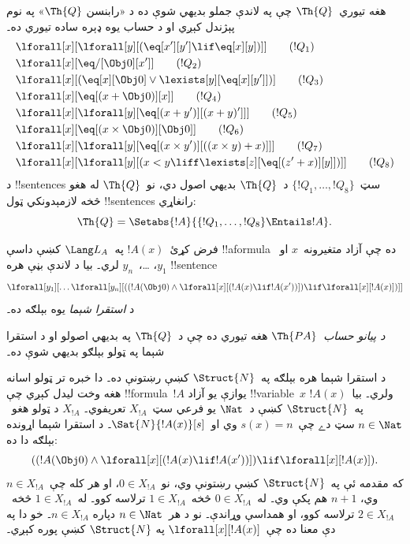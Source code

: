 \documentclass[../../../include/open-logic-section]{subfiles}
\begin{document}
\begin{defn}
هغه تيوري~$\Th{Q}$ چې په لاندې جملو بديهي شوې ده د «رابنسن
$\Th{Q}$» په نوم پېژندل کېږي او د حساب يوه ډېره ساده تيوري ده۔
\begin{align*}
& \lforall[x][\lforall[y][(\eq[x'][y'] \lif \eq[x][y])]] \tag{$!Q_1$}\\
& \lforall[x][\eq/[\Obj 0][x']] \tag{$!Q_2$}\\
& \lforall[x][(\eq[x][\Obj 0] \lor \lexists[y][\eq[x][y']])] \tag{$!Q_3$}\\
& \lforall[x][\eq[(x + \Obj 0)][x]] \tag{$!Q_4$}\\
& \lforall[x][\lforall[y][\eq[(x + y')][(x + y)']]] \tag{$!Q_5$}\\
& \lforall[x][\eq[(x \times \Obj 0)][\Obj 0]] \tag{$!Q_6$}\\
& \lforall[x][\lforall[y][\eq[(x \times y')][((x \times y) + x)]]] \tag{$!Q_7$}\\
& \lforall[x][\lforall[y][(x < y \liff \lexists[z][\eq[(z' + x)][y]])]] \tag{$!Q_8$}
\end{align*}
د !!{sentence}s سټ~$\{!Q_1, \dots, !Q_8\}$ د~$\Th{Q}$ بديهي اصول
دي، نو~$\Th{Q}$ له هغو څخه لازمېدونکي ټول !!{sentence}s رانغاړي:
\[
\Th{Q} = \Setabs{!A}{\{!Q_1, \dots, !Q_8\} \Entails !A}.
\]
\end{defn}

\begin{defn}
فرض کړئ~$!A(x)$ په~$\Lang L_A$ کښې داسې !!a{formula} ده چې آزاد
متغيرونه~$x$ او~$y_1$، \dots،~$y_n$ لري۔ بيا د لاندې بڼې هره
!!{sentence}
\[
\lforall[y_1][\dots\lforall[y_n][((!A(\Obj 0) \land \lforall[x][(!A(x)
\lif !A(x'))]) \lif \lforall[x][!A(x)])]]
\]
د \emph{استقرا شېما} يوه بېلګه ده۔

\emph{د پيانو حساب}~$\Th{PA}$ هغه تيوري ده چې د~$\Th{Q}$ په بديهي
اصولو او د استقرا شېما په ټولو بېلګو بديهي شوې ده۔
\end{defn}

\begin{explain}
د استقرا شېما هره بېلګه په~$\Struct{N}$ کښې رښتونې ده۔ دا خبره تر
ټولو اسانه هغه وخت ليدل کېږي چې !!{formula}~$!A$ يوازې يو آزاد
!!{variable}~$x$ ولري۔ بيا~$!A(x)$ په~$\Struct{N}$ کښې د~$\Nat$ يو
فرعي سټ~$X_{!A}$ تعريفوي۔ $X_{!A}$ د ټولو هغو~$n \in \Nat$ سټ دے
چې~$s(x) = n$ وي او~$\Sat{N}{!A(x)}[s]$۔ د استقرا شېما اړونده بېلګه
دا ده:
\[
((!A(\Obj 0) \land \lforall[x][(!A(x) \lif !A(x'))]) \lif
  \lforall[x][!A(x)]).
\]
که مقدمه ئې په~$\Struct{N}$ کښې رښتونې وي، نو~$0 \in X_{!A}$، او
هر کله چې~$n \in X_{!A}$ وي، $n+1$ هم پکې وي۔ له~$0 \in X_{!A}$
څخه~$1 \in X_{!A}$ ترلاسه کوو۔ له~$1 \in X_{!A}$ څخه~$2 \in X_{!A}$
ترلاسه کوو، او همداسې وړاندې۔ نو د هر~$n \in \Nat$ دپاره
$n \in X_{!A}$۔ خو دا په دې معنا ده چې~$\lforall[x][!A(x)]$ په
$\Struct{N}$ کښې پوره کېږي۔
\end{explain}
\end{document}
